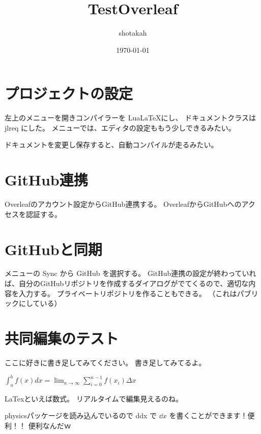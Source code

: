 \documentclass{jlreq}
\title{TestOverleaf}
\author{shotakah}
\date{\today}
\begin{document}
\maketitle

\section{プロジェクトの設定}

左上のメニューを開きコンパイラーを Lua\LaTeX にし、
ドキュメントクラスは jlreq にした。
メニューでは、エディタの設定ももう少しできるみたい。

ドキュメントを変更し保存すると、自動コンパイルが走るみたい。

\section{GitHub連携}

Overleafのアカウント設定からGitHub連携する。
OverleafからGitHubへのアクセスを認証する。

\section{GitHubと同期}

メニューの Sync から GitHub を選択する。
GitHub連携の設定が終わっていれば、自分のGitHubリポジトリを作成するダイアログがでてくるので、適切な内容を入力する。
プライベートリポジトリを作ることもできる。
（これはパブリックにしている）

\section{共同編集のテスト}

ここに好きに書き足してみてください。
書き足してみてるよ。

\begin{math}
\int^{b}_{a} f(x) dx = \lim_{n \to \infty} \sum^{n-1}_{i=0} f(x_{i}) \Delta x
\end{math}

LaTexといえば数式。
リアルタイムで編集見えるのね。

physicsパッケージを読み込んでいるので dd{x} で $\dd{x}$ を書くことができます！便利！！
便利なんだｗ
\end{document}
